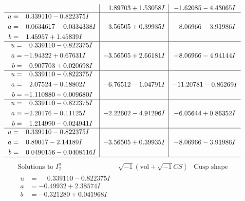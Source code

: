 \documentclass[1p]{elsarticle_modified}
\theoremstyle{definition}
\newcommand{\I}{\sqrt{-1}}
\begin{document}
$$\begin{array}{c|c|c}
 & \phantom{-}1.89703 + 1.53058 I & -1.62085 - 4.43065 I \\ \hline\begin{aligned}
u &= \phantom{-}0.339110 - 0.822375 I \\
a &= -0.0634617 - 0.0334338 I \\
b &= \phantom{-}1.45957 + 1.45839 I\end{aligned}
 & -3.56505 + 0.39935 I & -8.06966 - 3.91986 I \\ \hline\begin{aligned}
u &= \phantom{-}0.339110 - 0.822375 I \\
a &= -1.94322 + 0.67631 I \\
b &= \phantom{-}0.907703 + 0.020698 I\end{aligned}
 & -3.56505 + 2.66181 I & -8.06966 - 4.94144 I \\ \hline\begin{aligned}
u &= \phantom{-}0.339110 - 0.822375 I \\
a &= \phantom{-}2.07524 - 0.18802 I \\
b &= -1.110880 - 0.009680 I\end{aligned}
 & -6.76512 - 1.04791 I & -11.20781 - 0.86269 I \\ \hline\begin{aligned}
u &= \phantom{-}0.339110 - 0.822375 I \\
a &= -2.20176 - 0.11125 I \\
b &= \phantom{-}1.214990 - 0.024941 I\end{aligned}
 & -2.22602 - 4.91296 I & -6.05644 + 0.86352 I \\ \hline\begin{aligned}
u &= \phantom{-}0.339110 - 0.822375 I \\
a &= \phantom{-}0.89017 - 2.14189 I \\
b &= \phantom{-}0.0490156 - 0.0408516 I\end{aligned}
 & -3.56505 + 0.39935 I & -8.06966 - 3.91986 I\\
 \hline 
 \end{array}$$\newpage$$\begin{array}{c|c|c}  
\text{Solutions to }I^u_{2}& \I (\text{vol} + \sqrt{-1}CS) & \text{Cusp shape}\\
 \hline 
\begin{aligned}
u &= \phantom{-}0.339110 - 0.822375 I \\
a &= -0.49932 + 2.38574 I \\
b &= -0.321280 + 0.041968 I\end{aligned}

\end{array}$$
\end{document}
